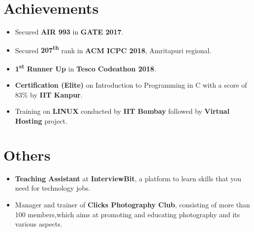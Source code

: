 \documentclass[letterpaper,11pt]{article}
\newcommand{\resumeSubHeadingListStart}{\begin{itemize}[leftmargin=*]}
\newcommand{\resumeSubHeadingListEnd}{\end{itemize}}
\begin{document}
\section{Achievements}
\resumeSubHeadingListStart
    \itemsep-0.25em 
    \item{
      Secured \textbf{AIR 993} in \textbf{GATE 2017}.
    }
    \item {
        Secured \textbf{207\textsuperscript{th}} rank in \textbf{ACM ICPC 2018}, Amritapuri regional.
    }
    \item {
        \textbf{1\textsuperscript{st} Runner Up} in \textbf{Tesco Codeathon 2018}.
    }
    \item{
      \textbf{Certification (Elite)} on Introduction to Programming in C with a score of 83\% by \textbf{IIT Kanpur}.
    }
    \item{
        Training on \textbf{LINUX} conducted by \textbf{IIT Bombay} followed by \textbf{Virtual Hosting} project.
    }
  \resumeSubHeadingListEnd
\section{Others}
\resumeSubHeadingListStart
    \itemsep-0.25em 
    \item{
        \textbf{Teaching Assistant} at \textbf{InterviewBit}, a platform to learn skills that you need for technology jobs.
    }
    \item{
      Manager and trainer of \textbf{Clicks Photography Club}, consisting of more than 100 members,which aims at promoting and educating photography and its various aspects.
    }
  \resumeSubHeadingListEnd

%


\end{document}
